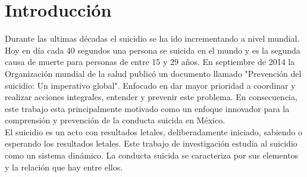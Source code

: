 % 
\section{Introducción}
{
Durante las ultimas décadas el suicidio se ha ido incrementando a nivel mundial. Hoy en día cada 40 segundos una persona se suicida en el mundo y es la segunda causa de muerte para personas de entre 15 y 29 años.
En septiembre de 2014 la Organización mundial de la salud publicó un documento llamado "Prevención del suicidio: Un imperativo global". Enfocado en dar mayor prioridad a coordinar y realizar acciones integrales, entender y prevenir este problema. En consecuencia, este trabajo esta principalmente motivado como un enfoque innovador para la comprensión y prevención de la conducta suicida en México.\\

El suicidio es un acto con resultados letales, deliberadamente iniciado, sabiendo o esperando los resultados letales.
Este trabajo de investigación estudia al suicidio como un sistema dinámico. La conducta suicida se caracteriza por sus elementos y la relación que hay entre ellos.
}
